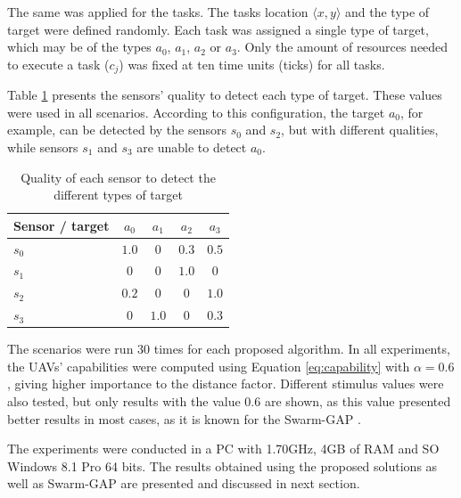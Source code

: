 The same was applied for the tasks. The tasks location $\langle x,y \rangle$ and the type of target were defined randomly. 
Each task was assigned a single type of target, which may be of the types $a_0$, $a_1$, $a_2$ or $a_3$.
Only the amount of resources needed to execute a task ($c_j$) was fixed at ten time units (ticks) for all tasks. 

Table \ref{table:quality} presents the sensors' quality to detect each type of target. These values were used in all scenarios. According to this configuration, the target $a_0$, for example, can be detected by the sensors $s_0$ and $s_2$, but with different qualities, while sensors $s_1$ and $s_3$ are unable to detect $a_0$.

\begin{table}[h!]
	\small
	\fontsize{8}{8}\selectfont
	\centering
	\caption{Quality of each sensor to detect the different types of target}
	\label{table:quality}
	\begin{tabular}{|l|c|c|c|c|} \hline
		Sensor / target  & $a_0$  & $a_1$  & $a_2$  & $a_3$    \\ \hline
		$s_0$              & $1.0$  & $0$  & $0.3$  & $0.5$      \\ \hline
		$s_1$              & $0$  & $0$  & $1.0$  & $0$           \\ \hline
		$s_2$              & $0.2$  & $0$  & $0$  & $1.0$        \\ \hline
		$s_3$              & $0$  & $1.0$  & $0$  & $0.3$        \\ \hline
	\end{tabular}
\end{table}


The scenarios were run 30 times for each proposed algorithm. 
In all experiments, the UAVs' capabilities were computed using Equation \ref{eq:capability} with $\alpha = 0.6$, giving higher importance to the distance factor.
Different stimulus values were also tested, but only results with the value 0.6 are shown, as this value presented better results in most cases, as it is known for the Swarm-GAP \cite{ferreira2010robocup}.

The experiments were conducted in a PC with 1.70GHz, 4GB of RAM and SO Windows 8.1 Pro 64 bits. 
The results obtained using the proposed solutions as well as Swarm-GAP are presented and discussed in next section.


